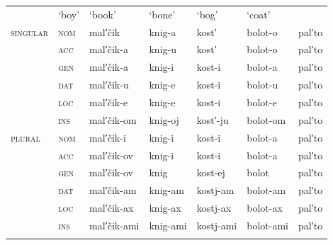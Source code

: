 \documentclass[output=paper]{langscibook}
\begin{document}
\begin{tabularx}{\textwidth}{XXXXXXX}

\lsptoprule
\multicolumn{2}{c}{} & ‘boy’ & ‘book’ & ‘bone’ & ‘bog’ & ‘coat’\\
 \textsc{singular} & \textsc{nom} & mal′čik & knig-a & kost′ & bolot-o & pal′to\\
& \textsc{acc} & mal′čik-a & knig-u & kost′ & bolot-o & pal′to\\
& \textsc{gen} & mal′čik-a & knig-i & kost-i & bolot-a & pal′to\\
& \textsc{dat} & mal′čik-u & knig-e & kost-i & bolot-u & pal′to\\
& \textsc{loc} & mal′čik-e & knig-e & kost-i & bolot-e & pal′to\\
& \textsc{ins} & mal′čik-om & knig-oj & kost′-ju & bolot-om & pal′to  \\
 \textsc{plural} & \textsc{nom} & mal′čik-i & knig-i & kost-i & bolot-a & pal′to\\
& \textsc{acc} & mal′čik-ov & knig-i & kost-i & bolot-a & pal′to\\
& \textsc{gen} & mal′čik-ov & knig & kost-ej & bolot & pal′to\\
& \textsc{dat} & mal′čik-am & knig-am & kostj-am & bolot-am & pal′to\\
& \textsc{loc} & mal′čik-ax & knig-ax & kostj-ax & bolot-ax & pal′to\\
& \textsc{ins} & mal′čik-ami & knig-ami & kostj-ami & bolot-ami & pal′to  \\
\lspbottomrule
\end{tabularx}
\begin{table}
\caption{Illustrative nouns from Russian\footnote{ \textrm{These nouns illustrate the point we need, and are not fully representative of the system. For simplicity, stress alternations have not been included.} }}
\label{tab:key:2}
\end{table}
\end{document}
